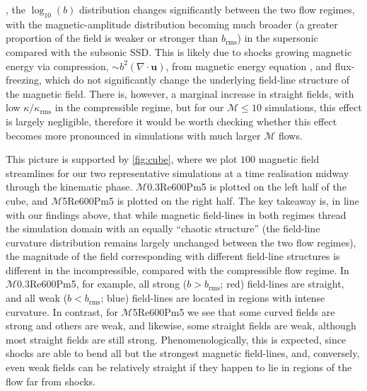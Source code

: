 \documentclass[12pt,twoside]{extreport}
\newcommand{\mVector}[1]{\bm{#1}} %
\newcommand{\mReh}{\ensuremath{\mathrm{Re}}} %
\newcommand{\mPrm}{\ensuremath{\mathrm{Pm}}} %
\newcommand{\mSonicMach}{\ensuremath{\mathcal{M}}} %
\newcommand{\SimName}[3]{$\mSonicMach${#1}$\mReh${#2}$\mPrm${#3}}
\begin{document}
{}, the $\log_{10}(b)$ distribution changes significantly between the two flow regimes, with the magnetic-amplitude distribution becoming much broader (a greater proportion of the field is weaker or stronger than $b_\mathrm{rms}$) in the supersonic compared with the subsonic SSD. This is likely due to shocks growing magnetic energy via compression, $\sim b^2(\nabla\cdot\mVector{u})$, from magnetic energy equation \citep{beattie2023bulk}, and flux-freezing, which do not significantly change the underlying field-line structure of the magnetic field. There is, however, a marginal increase in straight fields, with low $\kappa/\kappa_\mathrm{rms}$ in the compressible regime, but for our $\mSonicMach \leq 10$ simulations, this effect is largely negligible, therefore it would be worth checking whether this effect becomes more pronounced in simulations with much larger $\mSonicMach$ flows.

This picture is supported by \autoref{fig:cube}, where we plot $100$ magnetic field streamlines for our two representative simulations at a time realisation midway through the kinematic phase. \SimName{0.3}{600}{5} is plotted on the left half of the cube, and \SimName{5}{600}{5} is plotted on the right half. The key takeaway is, in line with our findings above, that while magnetic field-lines in both regimes thread the simulation domain with an equally ``chaotic structure'' (the field-line curvature distribution remains largely unchanged between the two flow regimes), the magnitude of the field corresponding with different field-line structures is different in the incompressible, compared with the compressible flow regime. In \SimName{0.3}{600}{5}, for example, all strong ($b > b_\mathrm{rms}$; red) field-lines are straight, and all weak ($b < b_\mathrm{rms}$; blue) field-lines are located in regions with intense curvature. In contrast, for \SimName{5}{600}{5} we see that some curved fields are strong and others are weak, and likewise, some straight fields are weak, although most straight fields are still strong. Phenomenologically, this is expected, since shocks are able to bend all but the strongest magnetic field-lines, and, conversely, even weak fields can be relatively straight if they happen to lie in regions of the flow far from shocks.
\end{document}
